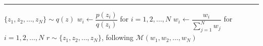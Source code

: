 \documentclass{article}
\begin{document}
        \begin{algorithm}[H]
            \DontPrintSemicolon
            \caption{Importance sampling algorithm}


            \BlankLine
            \hrule

            $\{z_1, z_2, \dots, z_N\} \sim q(z)$\;
            $w_i \leftarrow \dfrac{p(z_i)}{q(z_i)}$ for $i=1,2,\dots,N$\;
            $w_i \leftarrow \dfrac{w_i}{\sum_{j=1}^{N}w_j}$ for $i=1,2,\dots,N$\;
            $r \sim \{z_1, z_2, \dots, z_N\}$, following $\mathcal M(w_1, w_2,\dots,w_N)$\; 

        \end{algorithm}
\end{document}

